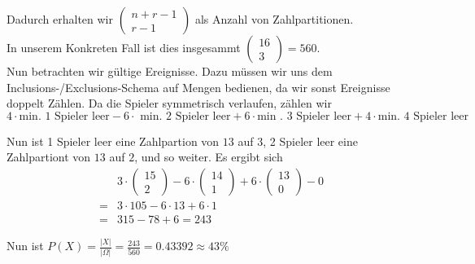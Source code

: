\documentclass[11pt,a4paper,ngerman]{article}
\begin{document}
Dadurch erhalten wir $\left( \begin{array}{cc} n + r - 1 \\ r - 1\end{array}\right)$ als Anzahl von Zahlpartitionen.\\ In unserem Konkreten Fall ist dies
insgesammt $\begin{pmatrix} 16 \\ 3 \end{pmatrix} = 560$.\\

Nun betrachten wir gültige Ereignisse. Dazu müssen wir uns dem Inclusions-/Exclusions-Schema auf Mengen bedienen, da wir sonst Ereignisse doppelt Zählen.
Da die Spieler symmetrisch verlaufen, zählen wir
\[
    4 \cdot \text{min. 1 Spieler leer} - 6 \cdot \text{ min. 2 Spieler leer} + 6 \cdot \text{min . 3 Spieler leer} + 4 \cdot \text{min. 4 Spieler leer}
\]

Nun ist 1 Spieler leer eine Zahlpartion von $13$ auf $3$, 2 Spieler leer eine Zahlpartiont von $13$ auf $2$, und so weiter. Es ergibt sich
\[\begin{array}{ll}
    &3 \cdot \begin{pmatrix} 15 \\ 2\end{pmatrix} - 6 \cdot \begin{pmatrix} 14 \\ 1 \end{pmatrix} + 6 \cdot \begin{pmatrix} 13 \\ 0 \end{pmatrix} - 0\\
    = & 3 \cdot 105 - 6 \cdot 13 + 6 \cdot 1\\
    = & 315 - 78 + 6 = 243
\end{array}\]

Nun ist $P(X) = \frac{|X|}{|\Omega|} = \frac{243}{560} = 0.43392 \approx 43 \%$


\label{LastPage}
\end{document}
